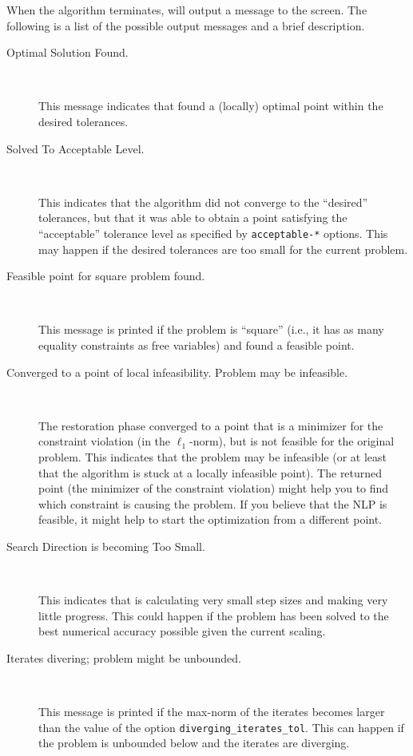 When the algorithm terminates, \IPOPT will output a message to the screen.
The following is a list of the possible output messages and a brief description.

\begin{description}
\item[Optimal Solution Found.] ~

    This message indicates that \IPOPT found a (locally) optimal point within the desired tolerances.

\item[Solved To Acceptable Level.] ~

    This indicates that the algorithm did not converge to the ``desired'' tolerances, but that it was able to obtain a point satisfying the ``acceptable'' tolerance level as specified by \texttt{acceptable-*} options.
    This may happen if the desired tolerances are too small for the current problem.

\item[Feasible point for square problem found.] ~

    This message is printed if the problem is ``square'' (i.e., it has as many equality constraints as free variables) and \IPOPT found a feasible point.

\item[Converged to a point of local infeasibility. Problem may be infeasible.] ~

    The restoration phase converged to a point that is a minimizer for the constraint violation (in the $\ell_1$-norm), but is not feasible for the original problem.
    This indicates that the problem may be infeasible (or at least that the algorithm is stuck at a locally infeasible point).
    The returned point (the minimizer of the constraint violation) might help you to find which constraint is causing the problem.
    If you believe that the NLP is feasible, it might help to start the optimization from a different point.

\item[Search Direction is becoming Too Small.] ~

    This indicates that \IPOPT is calculating very small step sizes and making very little progress.
    This could happen if the problem has been solved to the best numerical accuracy possible given the current scaling.

\item[Iterates divering; problem might be unbounded.] ~

    This message is printed if the max-norm of the iterates becomes larger than the value of the option \texttt{diverging\_iterates\_tol}.
    This can happen if the problem is unbounded below and the iterates are diverging.


\end{description}
